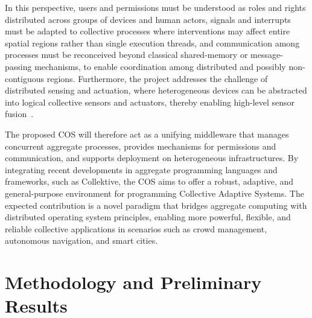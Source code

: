 \documentclass[runningheads]{llncs}
\begin{document}
    In this perspective,
    users and permissions must be understood as roles and rights distributed across groups of devices and human actors,
    signals and interrupts must be adapted to collective processes where interventions may affect entire spatial regions rather than single execution threads,
    and communication among processes must be reconceived beyond classical shared-memory or message-passing mechanisms,
    to enable coordination among distributed and possibly non-contiguous regions.
    Furthermore,
    the project addresses the challenge of distributed sensing and actuation,
    where heterogeneous devices can be abstracted into logical collective sensors and actuators,
    thereby enabling high-level sensor fusion~\cite{DBLP:journals/arc/Sasiadek02}.

    The proposed COS will therefore act as a unifying middleware that manages concurrent aggregate processes,
    provides mechanisms for permissions and communication,
    and supports deployment on heterogeneous infrastructures.
    By integrating recent developments in aggregate programming languages and frameworks,
    such as Collektive, the COS aims to offer a robust, adaptive,
    and general-purpose environment for programming Collective Adaptive Systems.
    The expected contribution is a novel paradigm that bridges aggregate computing with distributed operating system principles,
    enabling more powerful, flexible,
    and reliable collective applications in scenarios such as crowd management, autonomous navigation, and smart cities.

    \section{Methodology and Preliminary Results}\label{sec:methodology}
\end{document}
